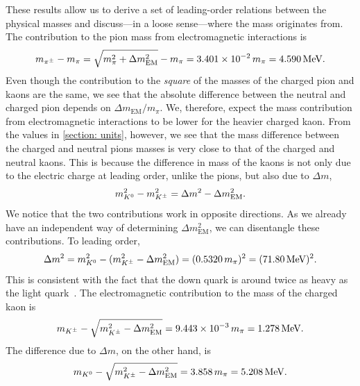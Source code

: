 These results allow us to derive a set of leading-order relations between the physical masses and discuss---in a loose sense---where the mass originates from. 
The contribution to the pion mass from electromagnetic interactions is
%
\begin{equation}
    m_{\pi^\pm} - m_\pi = \sqrt{m_{\pi}^2 + \Delta m_\text{EM}^2} - m_{\pi}
    = 3.401\times 10^{-2} \,m_\pi = 4.590\,\text{MeV}.
\end{equation}
%
Even though the contribution to the \emph{square} of the masses of the charged pion and kaons are the same, we see that the absolute difference between the neutral and charged pion depends on $\Delta m_\text{EM}/ m_\pi $.
We, therefore, expect the mass contribution from electromagnetic interactions to be lower for the heavier charged kaon.
From the values in \autoref{section: units}, however, we see that the mass difference between the charged and neutral pions masses is very close to that of the charged and neutral kaons.
This is because the difference in mass of the kaons is not only due to the electric charge at leading order, unlike the pions, but also due to $\Delta m$,
%
\begin{equation}
    m_{K^0}^2 - m_{K^\pm}^2 = \Delta m^2 - \Delta m_\text{EM}^2.
\end{equation}
%
We notice that the two contributions work in opposite directions.
As we already have an independent way of determining $\Delta m_\text{EM}^2$, we can disentangle these contributions.
To leading order,
%
\begin{equation}
    \Delta m^2 
    = { m_{K^0}^2 - (m_{K^\pm}^2 - \Delta m^2_\text{EM})}
    = (0.5320 \, m_\pi)^2 = (71.80\, \text{MeV})^2.
\end{equation}
%
This is consistent with the fact that the down quark is around twice as heavy as the light quark~\autocite{zylaReviewParticlePhysics2020}.
The electromagnetic contribution to the mass of the charged kaon is
%
\begin{equation}
    m_{{K^\pm}} - \sqrt{m_{{K^\pm}}^2 - \Delta m_\text{EM}^2} 
    = 9.443 \times 10^{-3} \, m_\pi = 1.278 \, \text{MeV}.
\end{equation}
%
The difference due to $\Delta m$, on the other hand, is
%
\begin{equation}
    m_{K^0} - \sqrt{m_{K^\pm}^2 - \Delta m_\text{EM}^2}
    = 3.858\,m_\pi = 5.208\, \text{MeV}.
\end{equation}

